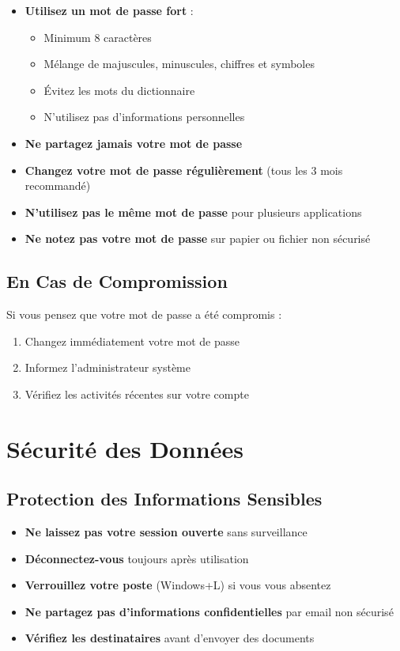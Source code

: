 \documentclass[12pt,a4paper]{report}
\begin{document}
\begin{itemize}[leftmargin=*]
    \item \textbf{Utilisez un mot de passe fort} :
    \begin{itemize}
        \item Minimum 8 caractères
        \item Mélange de majuscules, minuscules, chiffres et symboles
        \item Évitez les mots du dictionnaire
        \item N'utilisez pas d'informations personnelles
    \end{itemize}
    \item \textbf{Ne partagez jamais votre mot de passe}
    \item \textbf{Changez votre mot de passe régulièrement} (tous les 3 mois recommandé)
    \item \textbf{N'utilisez pas le même mot de passe} pour plusieurs applications
    \item \textbf{Ne notez pas votre mot de passe} sur papier ou fichier non sécurisé
\end{itemize}

\subsection{En Cas de Compromission}

Si vous pensez que votre mot de passe a été compromis :

\begin{enumerate}[leftmargin=*]
    \item Changez immédiatement votre mot de passe
    \item Informez l'administrateur système
    \item Vérifiez les activités récentes sur votre compte
\end{enumerate}

\section{Sécurité des Données}

\subsection{Protection des Informations Sensibles}

\begin{itemize}[leftmargin=*]
    \item \textbf{Ne laissez pas votre session ouverte} sans surveillance
    \item \textbf{Déconnectez-vous} toujours après utilisation
    \item \textbf{Verrouillez votre poste} (Windows+L) si vous vous absentez
    \item \textbf{Ne partagez pas d'informations confidentielles} par email non sécurisé
    \item \textbf{Vérifiez les destinataires} avant d'envoyer des documents
\end{itemize}
\end{document}
